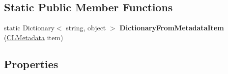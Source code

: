 \subsection*{Static Public Member Functions}
\begin{DoxyCompactItemize}
\item 
\hypertarget{class_cloud_api_public_1_1_model_1_1_c_l_metadata_a90a14af201999b5c4197f75c0fd615bd}{static Dictionary$<$ string, object $>$ {\bfseries Dictionary\-From\-Metadata\-Item} (\hyperlink{class_cloud_api_public_1_1_model_1_1_c_l_metadata}{C\-L\-Metadata} item)}\label{class_cloud_api_public_1_1_model_1_1_c_l_metadata_a90a14af201999b5c4197f75c0fd615bd}

\end{DoxyCompactItemize}
\subsection*{Properties}
